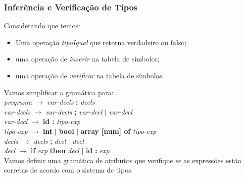 \documentclass[table]{beamer}
\begin{document}
\begin{frame}
   \frametitle{Inferência e Verificação de Tipos}
   Considerando que temos:
   \begin{itemize}
      \item Uma operação \textit{tipoIgual} que retorna verdadeiro ou falso;
      \item uma operação de \textit{inserir} na tabela de símbolos;
      \item uma operação de \textit{verificar} na tabela de símbolos.
   \end{itemize}
   Vamos simplificar a gramática para: \\
   \textit{programa} $\to$ \textit{var-decls} \textbf{;} \textit{decls} \\
   \textit{var-decls} $\to$ \textit{var-decls} \textbf{;} \textit{var-decl} $|$ \textit{var-decl} \\
   \textit{var-decl} $\to$ \textbf{id :} \textit{tipo-exp} \\
   \textit{tipo-exp} $\to$ \textbf{int} $|$ \textbf{bool} $|$ \textbf{array [num] of} \textit{tipo-exp} \\
   \textit{decls} $\to$ \textit{decls} \textbf{;} \textit{decl} $|$ \textit{decl} \\
   \textit{decl} $\to$ \textbf{if} \textit{exp} \textbf{then} \textit{decl} $|$ \textbf{id :} \textit{exp} \\
   Vamos definir uma gramática de atributos que verifique se as expressões estão corretas de acordo com o sistema de tipos.
\end{frame}
\end{document}
